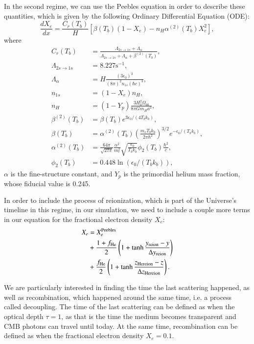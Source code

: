 \documentclass{aa}
\begin{document}
In the second regime, we can use the Peebles equation in order to describe these quantities, which is given by the following Ordinary Differential Equation (ODE):
\begin{equation}
\frac{dX_e}{dx} = \frac{C_r(T_b)}{H} \left[\beta(T_b)(1-X_e) - n_H
\alpha^{(2)}(T_b)X_e^2\right],
\end{equation}
where
\begin{align}
C_r(T_b) &= \frac{\Lambda_{2s\rightarrow1s} + \Lambda_{\alpha}}{\Lambda_{2s\rightarrow1s} + \Lambda_{\alpha} + \beta^{(2)}(T_b)},\\
\Lambda_{2s\rightarrow1s} &= 8.227 \textrm{s}^{-1},\\
\Lambda_{\alpha} &= H\frac{(3\epsilon_0)^3}{(8\pi)^2 n_{1s}(\hbar c)^3},\\
n_{1s} &= (1-X_e)n_H,\\
n_H &= (1-Y_p)\frac{3H_0^2\Omega_{b0}}{8\pi G m_H a^3},\\
\beta^{(2)}(T_b) &= \beta(T_b) e^{3\epsilon_0/(4T_bk_b)},\\
\beta(T_b) &= \alpha^{(2)}(T_b) \left(\frac{m_eT_bk_b}{2\pi\hbar^2}\right)^{3/2} e^{-\epsilon_0/(T_bk_b)},\\
\alpha^{(2)}(T_b) &= \frac{64\pi}{\sqrt{27\pi}}\frac{\alpha^2}{m_e^2}\sqrt{\frac{\epsilon_0}{T_bk_b}}\phi_2(T_b)\frac{\hbar^2}{c},\\
\phi_2(T_b) &= 0.448\ln(\epsilon_0/(T_bk_b)),
\end{align}
$\alpha$ is the fine-structure constant, and $Y_p$ is the primordial helium mass fraction, whose fiducial value is 0.245.

In order to include the process of reionization, which is part of the Universe's timeline in this regime, in our simulation, we need to include a couple more terms in our equation for the fractional electron density $X_e$:
\begin{align}
X_e &= X_e^{\rm Peebles}\nonumber\\ &+ \frac{1+f_{\rm He}}{2}\left(1+\tanh\frac{y_{\rm reion}-y}{\Delta y_{\rm reion}}\right)\\ &+ \frac{f_{\rm He}}{2}\left(1 + \tanh \frac{z_{\rm He reion}-z}{\Delta z_{\rm He reion}}\right)\nonumber.
\end{align}

We are particularly interested in finding the time the last scattering happened, as well as recombination, which happened around the same time, i.e. a process called decoupling. The time of the last scattering can be defined as when the optical depth $\tau=1$, as that is the time the medium becomes transparent and CMB photons can travel until today. At the same time, recombination can be defined as when the fractional electron density $X_e = 0.1$.
\end{document}
